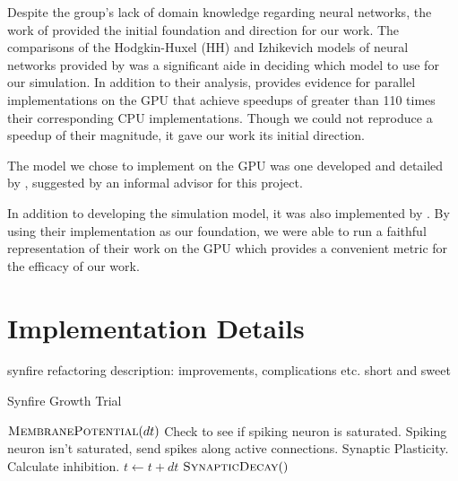 \documentclass[a4paper]{article}
\begin{document}
Despite the group's lack of domain knowledge regarding neural networks, the work of \cite{accel} provided the initial foundation and direction for our work. The comparisons of the Hodgkin-Huxel (HH) and Izhikevich models of neural networks provided by \cite{accel} was a significant aide in deciding which model to use for our simulation. In addition to their analysis, \cite{accel} provides evidence for parallel implementations on the GPU that achieve speedups of greater than 110 times their corresponding CPU implementations. Though we could not reproduce a speedup of their magnitude, it gave our work its initial direction. 

The model we chose to implement on the GPU was one developed and detailed by \cite{synfire}, suggested by an informal advisor for this project.

In addition to developing the simulation model, it was also implemented by \cite{synfire}. By using their implementation as our foundation, we were able to run a faithful representation of their work on the GPU which provides a convenient metric for the efficacy of our work.

\section{Implementation Details}

{\color{red} synfire refactoring description: improvements, complications etc. short and sweet}

\begin{algorithm}[H]
\caption{Synfire Growth Trial}
\label{alg:syn}
\begin{algorithmic}
    \State $\textsc{MembranePotential}(dt)$
        \State Check to see if spiking neuron is saturated.
        \State Spiking neuron isn't saturated, send spikes along active connections.
        \State Synaptic Plasticity.
    \EndFor
        \State Calculate inhibition.
    \EndFor
    \State $t \gets t + dt$
\EndWhile
\State $\textsc{SynapticDecay}()$
\end{algorithmic}
\end{algorithm}
\end{document}
